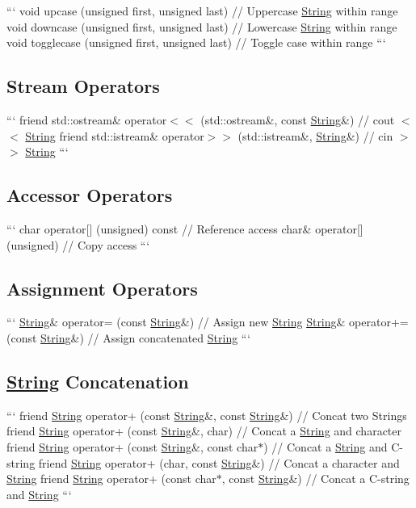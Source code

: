 ``` void upcase (unsigned first, unsigned last) // Uppercase \hyperlink{classString}{String} within range void downcase (unsigned first, unsigned last) // Lowercase \hyperlink{classString}{String} within range void togglecase (unsigned first, unsigned last) // Toggle case within range ```

\subsection*{Stream Operators }

``` friend std\-::ostream\& operator$<$$<$ (std\-::ostream\&, const \hyperlink{classString}{String}\&) // cout $<$$<$ \hyperlink{classString}{String} friend std\-::istream\& operator$>$$>$ (std\-::istream\&, \hyperlink{classString}{String}\&) // cin $>$$>$ \hyperlink{classString}{String} ```

\subsection*{Accessor Operators }

``` char operator\mbox{[}\mbox{]} (unsigned) const // Reference access char\& operator\mbox{[}\mbox{]} (unsigned) // Copy access ```

\subsection*{Assignment Operators }

``` \hyperlink{classString}{String}\& operator= (const \hyperlink{classString}{String}\&) // Assign new \hyperlink{classString}{String} \hyperlink{classString}{String}\& operator+= (const \hyperlink{classString}{String}\&) // Assign concatenated \hyperlink{classString}{String} ```

\subsection*{\hyperlink{classString}{String} Concatenation }

``` friend \hyperlink{classString}{String} operator+ (const \hyperlink{classString}{String}\&, const \hyperlink{classString}{String}\&) // Concat two Strings friend \hyperlink{classString}{String} operator+ (const \hyperlink{classString}{String}\&, char) // Concat a \hyperlink{classString}{String} and character friend \hyperlink{classString}{String} operator+ (const \hyperlink{classString}{String}\&, const char$\ast$) // Concat a \hyperlink{classString}{String} and C-\/string friend \hyperlink{classString}{String} operator+ (char, const \hyperlink{classString}{String}\&) // Concat a character and \hyperlink{classString}{String} friend \hyperlink{classString}{String} operator+ (const char$\ast$, const \hyperlink{classString}{String}\&) // Concat a C-\/string and \hyperlink{classString}{String} ```

